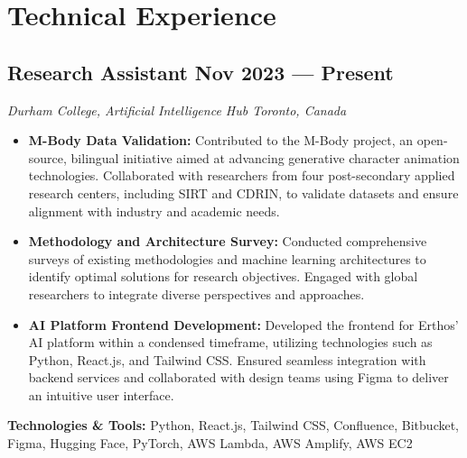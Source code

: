 \documentclass[a4paper,10pt]{article}
\newenvironment{zitemize}{
  \begin{itemize} 
    \itemsep 0pt 
    \parskip 0pt 
    \parsep 1pt
    \topsep 0pt 
    \partopsep 0pt
    \sloppy
}{
  \end{itemize}
  \vspace{0.5em} %
}
\begin{document}
\section{Technical Experience}
\subsection*{Research Assistant \hfill Nov 2023 --- Present}
\textit{Durham College, Artificial Intelligence Hub \hfill Toronto, Canada}
\begin{zitemize}
    \item \textbf{M-Body Data Validation:} Contributed to the M-Body project, an open-source, bilingual initiative aimed at advancing generative character animation technologies. Collaborated with researchers from four post-secondary applied research centers, including SIRT and CDRIN, to validate datasets and ensure alignment with industry and academic needs.
    \item \textbf{Methodology and Architecture Survey:} Conducted comprehensive surveys of existing methodologies and machine learning architectures to identify optimal solutions for research objectives. Engaged with global researchers to integrate diverse perspectives and approaches.
    \item \textbf{AI Platform Frontend Development:} Developed the frontend for Erthos' AI platform within a condensed timeframe, utilizing technologies such as Python, React.js, and Tailwind CSS. Ensured seamless integration with backend services and collaborated with design teams using Figma to deliver an intuitive user interface.
\end{zitemize}
\textbf{Technologies \& Tools:} Python, React.js, Tailwind CSS, Confluence, Bitbucket, Figma, Hugging Face, PyTorch, AWS Lambda, AWS Amplify, AWS EC2

\vspace{6pt}
\end{document}

